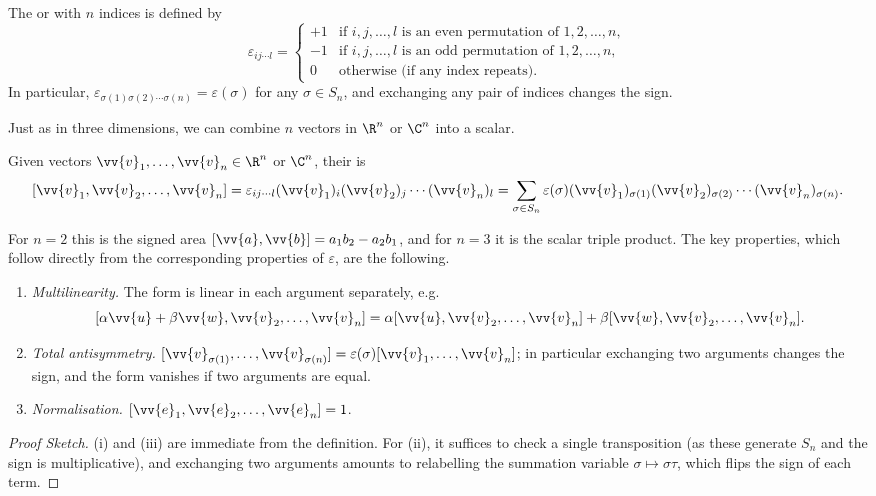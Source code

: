 \begin{definition}
	The  or  with $n$ indices is defined by
	$$
	\varepsilon_{ij \cdots l} = \begin{cases}
		+1 & \mbox{if } i, j, \dots, l \text{ is an even permutation of } 1, 2, \dots, n, \\
		-1 & \mbox{if } i, j, \dots, l \text{ is an odd permutation of } 1, 2, \dots, n, \\
		0 & \mbox{otherwise (if any index repeats)}.
	\end{cases}
	$$
	In particular, $\varepsilon_{\sigma(1)\sigma(2)\cdots\sigma(n)} = \varepsilon(\sigma)$ for any $\sigma \in S_n$, and exchanging any pair of indices changes the sign.
\end{definition}

Just as in three dimensions, we can combine $n$ vectors in $\R^n$ or $\C^n$ into a scalar.

\begin{definition}
	Given vectors $\vv{v}_1, \dots, \vv{v}_n \in \R^n$ or $\C^n$, their  is
	$$
	[\vv{v}_1, \vv{v}_2, \dots, \vv{v}_n] = \varepsilon_{ij\cdots l}(\vv{v}_1)_i (\vv{v}_2)_j \cdots (\vv{v}_n)_l = \sum_{\sigma \in S_n} \varepsilon(\sigma)(\vv{v}_1)_{\sigma(1)}(\vv{v}_2)_{\sigma(2)} \cdots (\vv{v}_n)_{\sigma(n)}.
	$$
\end{definition}

For $n = 2$ this is the signed area $[\vv{a}, \vv{b}] = a_1 b_2 - a_2 b_1$, and for $n = 3$ it is the scalar triple product. The key properties, which follow directly from the corresponding properties of $\varepsilon$, are the following.

\begin{proposition}
	\begin{enumerate}[label=(\roman*)]
		\item \emph{Multilinearity.} The form is linear in each argument separately, e.g.
		$$[\alpha \vv{u} + \beta \vv{w}, \vv{v}_2, \dots, \vv{v}_n] = \alpha[\vv{u}, \vv{v}_2, \dots, \vv{v}_n] + \beta [\vv{w}, \vv{v}_2, \dots, \vv{v}_n].$$
		\item \emph{Total antisymmetry.} $[\vv{v}_{\sigma(1)}, \dots, \vv{v}_{\sigma(n)}] = \varepsilon(\sigma)[\vv{v}_1, \dots, \vv{v}_n]$; in particular exchanging two arguments changes the sign, and the form vanishes if two arguments are equal.
		\item \emph{Normalisation.} $[\vv{e}_1, \vv{e}_2, \dots, \vv{e}_n] = 1$.
	\end{enumerate}
\end{proposition}
\begin{proof}[Proof Sketch]
	(i) and (iii) are immediate from the definition. For (ii), it suffices to check a single transposition (as these generate $S_n$ and the sign is multiplicative), and exchanging two arguments amounts to relabelling the summation variable $\sigma \mapsto \sigma \tau$, which flips the sign of each term.
\end{proof}

